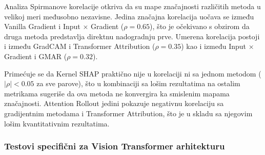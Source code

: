 Analiza Spirmanove korelacije otkriva da su mape značajnosti različitih metoda u velikoj meri međusobno nezavisne. Jedina značajna korelacija uočava se između Vanilla Gradient i Input $\times$ Gradient ($\rho = 0.65$), 
što je očekivano s obzirom da druga metoda predstavlja direktnu nadogradnju prve. Umerena korelacija postoji i između GradCAM i Transformer Attribution 
($\rho = 0.35$) kao i između Input $\times$ Gradient i GMAR ($\rho = 0.32$).

Primećuje se da Kernel SHAP praktično nije u korelaciji ni sa jednom metodom ($|\rho| < 0.05$ za sve parove), što u kombinaciji sa lošim rezultatima na ostalim metrikama sugeriše da ova metoda ne konvergira ka smislenim mapama značajnosti. Attention Rollout 
jedini pokazuje negativnu korelaciju sa gradijentnim metodama i Transformer Attribution, što je u skladu sa njegovim lošim kvantitativnim rezultatima.

\subsubsection{Testovi specifični za Vision Transformer arhitekturu}

\begin{table}[h]
\centering
\caption{Spirmanova korelacija mapa značajnosti pre i posle perturbacije ulaza ($\rho \pm \sigma$). Viši $\rho$ označava veću robustnost metode.}
\label{tab:robustness}
\end{table}

